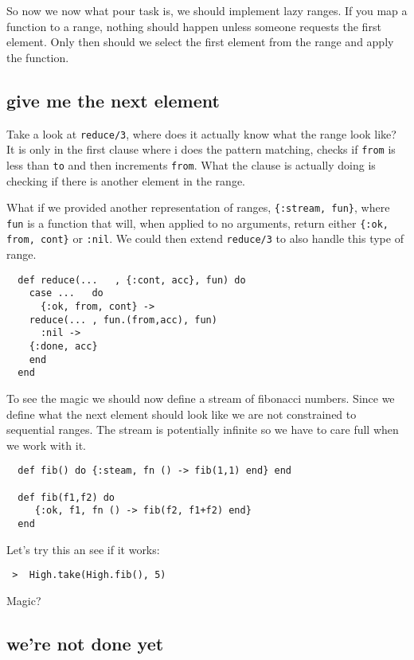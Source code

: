 \documentclass[a4paper,11pt]{article}
\begin{document}
So now we now what pour task is, we should implement lazy ranges. If
you map a function to a range, nothing should happen unless someone
requests the first element. Only then should we select the first
element from the range and apply the function.

\subsection{give me the next element}

Take a look at {\tt reduce/3}, where does it actually know what the
range look like? It is only in the first clause where i does the
pattern matching, checks if {\tt from} is less than {\tt to} and then
increments {\tt from}. What the clause is actually doing is checking if
there is another element in the range.

What if we provided another representation of ranges, {\tt \{:stream,
  fun\}}, where {\tt fun} is a function that will, when applied to no
arguments, return either {\tt \{:ok, from, cont\}} or {\tt :nil}. We
could then extend {\tt reduce/3} to also handle this type of range.

\begin{verbatim}
  def reduce(...   , {:cont, acc}, fun) do
    case ...   do
      {:ok, from, cont} ->
	reduce(... , fun.(from,acc), fun)
      :nil ->
	{:done, acc}
    end
  end
\end{verbatim}

\noindent To see the magic we should now define a stream of fibonacci
numbers. Since we define what the next element should look like we are
not constrained to sequential ranges. The stream is potentially
infinite so we have to care full when we work with it.


\begin{verbatim}
  def fib() do {:steam, fn () -> fib(1,1) end} end

  def fib(f1,f2) do
     {:ok, f1, fn () -> fib(f2, f1+f2) end}
  end
\end{verbatim}

\noindent Let's try this an see if it works:

\begin{verbatim}
 >  High.take(High.fib(), 5)
\end{verbatim}

\noindent Magic?

\subsection{we're not done yet}
\end{document}
